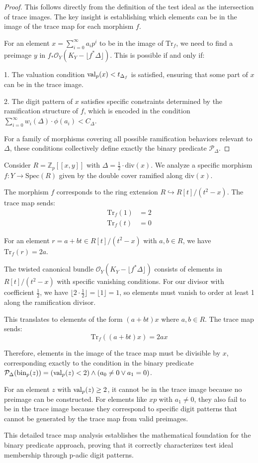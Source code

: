 \begin{proof}
This follows directly from the definition of the test ideal as the intersection of trace images. The key insight is establishing which elements can be in the image of the trace map for each morphism $f$.

For an element $x = \sum_{i=0}^{\infty} a_i p^i$ to be in the image of $\text{Tr}_f$, we need to find a preimage $y$ in $f_*\mathcal{O}_Y(K_Y - \lfloor f^*\Delta\rfloor)$. This is possible if and only if:

1. The valuation condition $\operatorname{val}_p(x) < t_{\Delta_f}$ is satisfied, ensuring that some part of $x$ can be in the trace image.

2. The digit pattern of $x$ satisfies specific constraints determined by the ramification structure of $f$, which is encoded in the condition $\sum_{i=0}^{\infty} w_i(\Delta) \cdot \phi(a_i) < C_{\Delta}$.

For a family of morphisms covering all possible ramification behaviors relevant to $\Delta$, these conditions collectively define exactly the binary predicate $\mathcal{P}_\Delta$.
\end{proof}

\begin{example}\label{ex:explicit-trace}
Consider $R = \mathbb{Z}_p[[x,y]]$ with $\Delta = \frac{1}{2} \cdot \text{div}(x)$. We analyze a specific morphism $f: Y \to \text{Spec}(R)$ given by the double cover ramified along $\text{div}(x)$.

The morphism $f$ corresponds to the ring extension $R \hookrightarrow R[t]/(t^2-x)$. The trace map sends:
\begin{align*}
\text{Tr}_f(1) &= 2 \\
\text{Tr}_f(t) &= 0
\end{align*}

For an element $r = a + bt \in R[t]/(t^2-x)$ with $a,b \in R$, we have $\text{Tr}_f(r) = 2a$.

The twisted canonical bundle $\mathcal{O}_Y(K_Y - \lfloor f^*\Delta\rfloor)$ consists of elements in $R[t]/(t^2-x)$ with specific vanishing conditions. For our divisor with coefficient $\frac{1}{2}$, we have $\lfloor 2 \cdot \frac{1}{2} \rfloor = \lfloor 1 \rfloor = 1$, so elements must vanish to order at least 1 along the ramification divisor.

This translates to elements of the form $(a + bt)x$ where $a,b \in R$. The trace map sends:
$$\text{Tr}_f((a + bt)x) = 2ax$$

Therefore, elements in the image of the trace map must be divisible by $x$, corresponding exactly to the condition in the binary predicate $\mathcal{P}_\Delta(\operatorname{bin}_p(z)) = (\operatorname{val}_p(z) < 2) \wedge (a_0 \neq 0 \vee a_1 = 0)$.

For an element $z$ with $\operatorname{val}_p(z) \geq 2$, it cannot be in the trace image because no preimage can be constructed. For elements like $xp$ with $a_1 \neq 0$, they also fail to be in the trace image because they correspond to specific digit patterns that cannot be generated by the trace map from valid preimages.
\end{example}

This detailed trace map analysis establishes the mathematical foundation for the binary predicate approach, proving that it correctly characterizes test ideal membership through p-adic digit patterns. 